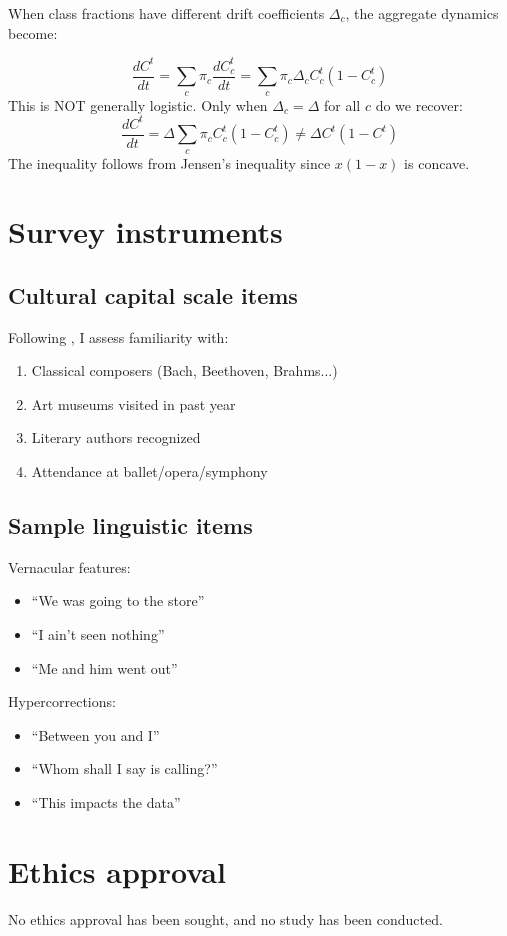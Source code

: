 \documentclass[12pt]{article}
\begin{document}
When class fractions have different drift coefficients $\Delta_c$, the aggregate dynamics become:

\begin{equation}
\frac{dC^t}{dt} = \sum_c \pi_c \frac{dC^t_c}{dt} = \sum_c \pi_c \Delta_c C^t_c(1-C^t_c)
\end{equation}
This is NOT generally logistic. Only when $\Delta_c = \Delta$ for all $c$ do we recover:
\begin{equation}
\frac{dC^t}{dt} = \Delta \sum_c \pi_c C^t_c(1-C^t_c) \neq \Delta C^t(1-C^t)
\end{equation}
The inequality follows from Jensen's inequality since $x(1-x)$ is concave.

\section{Survey instruments}

\subsection{Cultural capital scale items}

Following \textcite{dimaggio1982}, I assess familiarity with:
\begin{enumerate}
\item Classical composers (Bach, Beethoven, Brahms...)
\item Art museums visited in past year
\item Literary authors recognized
\item Attendance at ballet/opera/symphony
\end{enumerate}

\subsection{Sample linguistic items}

Vernacular features:
\begin{itemize}
\item \enquote{We was going to the store}
\item \enquote{I ain't seen nothing}
\item \enquote{Me and him went out}
\end{itemize}

Hypercorrections:
\begin{itemize}
\item \enquote{Between you and I}
\item \enquote{Whom shall I say is calling?}
\item \enquote{This impacts the data}
\end{itemize}

\section{Ethics approval}

No ethics approval has been sought, and no study has been conducted.

\newpage
\printbibliography[title=References]
\end{document}
